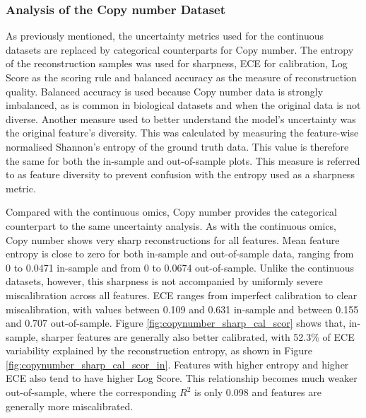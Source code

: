 \subsubsection{Analysis of the Copy number Dataset}

As previously mentioned, the uncertainty metrics used for the continuous datasets are replaced by categorical counterparts for Copy number. The entropy of the reconstruction samples was used for sharpness, ECE for calibration, Log Score as the scoring rule and balanced accuracy as the measure of reconstruction quality. Balanced accuracy is used because Copy number data is strongly imbalanced, as is common in biological datasets and when the original data is not diverse. Another measure used to better understand the model's uncertainty was the original feature's diversity. This was calculated by measuring the feature-wise normalised Shannon's entropy of the ground truth data. This value is therefore the same for both the in-sample and out-of-sample plots. This measure is referred to as feature diversity to prevent confusion with the entropy used as a sharpness metric.

Compared with the continuous omics, Copy number provides the categorical counterpart to the same uncertainty analysis. As with the continuous omics, Copy number shows very sharp reconstructions for all features. Mean feature entropy is close to zero for both in-sample and out-of-sample data, ranging from 0 to 0.0471 in-sample and from 0 to 0.0674 out-of-sample. Unlike the continuous datasets, however, this sharpness is not accompanied by uniformly severe miscalibration across all features. ECE ranges from imperfect calibration to clear miscalibration, with values between 0.109 and 0.631 in-sample and between 0.155 and 0.707 out-of-sample. Figure \ref{fig:copynumber_sharp_cal_scor} shows that, in-sample, sharper features are generally also better calibrated, with 52.3\% of ECE variability explained by the reconstruction entropy, as shown in Figure \ref{fig:copynumber_sharp_cal_scor_in}. Features with higher entropy and higher ECE also tend to have higher Log Score. This relationship becomes much weaker out-of-sample, where the corresponding $R^2$ is only 0.098 and features are generally more miscalibrated.

